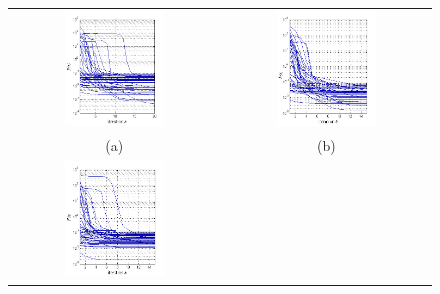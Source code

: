 \begin{figure}[t] 
\centering
\begin{tabular}{cc}
 \includegraphics[width=0.5\textwidth,height =0.45\textheight]{figures/ccp/convergence_m4_2}
&
  \includegraphics[width=0.5\textwidth,height =0.45\textheight]{figures/ccp/convergence_m5_2_.png} 
  \\   (a) & (b)    \\
 \includegraphics[width=0.5\textwidth,height =0.45\textheight]{figures/ccp/convergence_m7_2}    

\end{tabular}
\end{figure}
